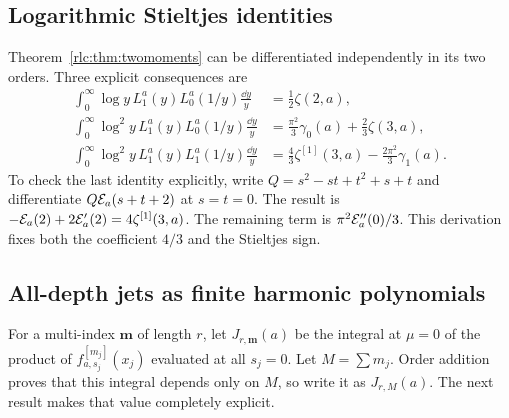 \subsection{Logarithmic Stieltjes identities}
Theorem~\ref{rlc:thm:twomoments} can be differentiated independently in
its two orders. Three explicit consequences are
\begin{align}
 \int_0^\infty\log y\,L_1^a(y)L_0^a(1/y)\frac{\dd y}{y}
 &=\frac12\zeta(2,a),\label{rlc:eq:jetlog1}\\
 \int_0^\infty\log^2 y\,L_1^a(y)L_0^a(1/y)\frac{\dd y}{y}
 &=\frac{\pi^2}{3}\gamma_0(a)+\frac23\zeta(3,a),
 \label{rlc:eq:jetlog2}\\
 \int_0^\infty\log^2 y\,L_1^a(y)L_1^a(1/y)\frac{\dd y}{y}
 &=\frac43\zeta^{[1]}(3,a)-\frac{2\pi^2}{3}\gamma_1(a).
 \label{rlc:eq:jetlogmixed}
\end{align}
To check the last identity explicitly, write
$Q=s^2-st+t^2+s+t$ and differentiate
$Q\mathcal E_a(s+t+2)$ at $s=t=0$. The result is
$-\mathcal E_a(2)+2\mathcal E_a'(2)=4\zeta^{[1]}(3,a)$.
The remaining term is $\pi^2\mathcal E_a''(0)/3$.
This derivation fixes both the coefficient $4/3$ and the Stieltjes sign.

\subsection{All-depth jets as finite harmonic polynomials}
For a multi-index $\boldsymbol m$ of length $r$, let
$J_{r,\boldsymbol m}(a)$ be the integral at $\mu=0$ of the product of
$f_{a,s_j}^{[m_j]}(x_j)$ evaluated at all $s_j=0$. Let
$M=\sum m_j$. Order addition proves that this integral depends only on
$M$, so write it as $J_{r,M}(a)$.
The next result makes that value completely explicit.

